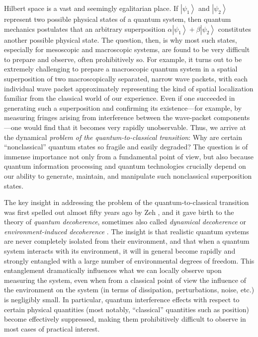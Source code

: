\documentclass[3p,sort&compress,12pt]{elsarticle}
\newcommand{\ket}[1]{\left\vert{#1}\right\rangle}
\begin{document}
Hilbert space is a vast and seemingly egalitarian place. If $\ket{\psi_1}$ and $\ket{\psi_2}$ represent two possible physical states of a quantum system, then quantum mechanics postulates that an arbitrary superposition $\alpha\ket{\psi_1} + \beta \ket{\psi_2}$ constitutes another possible physical state. The question, then, is why most such states, especially for mesoscopic and macroscopic systems, are found to be very difficult to prepare and observe, often prohibitively so. For example, it turns out to be extremely challenging to prepare a macroscopic quantum system in a spatial superposition of two macroscopically separated, narrow wave packets, with each individual wave packet approximately representing the kind of spatial localization familiar from the classical world of our experience. Even if one succeeded in generating such a superposition and confirming its existence---for example, by measuring fringes arising from interference between the wave-packet components---one would find that it becomes very rapidly unobservable. Thus, we arrive at the dynamical \emph{problem of the quantum-to-classical transition}: Why are certain ``nonclassical'' quantum states so fragile and easily degraded? The question is of immense importance not only from a fundamental point of view, but also because quantum information processing and quantum technologies crucially depend on our ability to generate, maintain, and manipulate such nonclassical superposition states. 

The key insight in addressing the problem of the quantum-to-classical transition was first spelled out almost fifty years ago by Zeh \cite{Zeh:1970:yt}, and it gave birth to the theory of \emph{quantum decoherence}, sometimes also called \emph{dynamical decoherence} or \emph{environment-induced decoherence} \cite{Zeh:1970:yt,Zurek:1981:dd,Zurek:1982:tv,Paz:2001:aa,Zurek:2002:ii,Schlosshauer:2003:tv,Bacciagaluppi:2003:yz,Joos:2003:jh,Schlosshauer:2007:un}. The insight is that realistic quantum systems are never completely isolated from their environment, and that when a quantum system interacts with its environment, it will in general become rapidly  and strongly entangled with a large number of environmental degrees of freedom. This entanglement dramatically influences what we can locally observe upon measuring the system, even when from a classical point of view the influence of the environment on the system (in terms of dissipation, perturbations, noise, etc.) is negligibly small. In particular, quantum interference effects with respect to certain physical quantities (most notably, ``classical'' quantities such as position) become effectively suppressed, making them prohibitively difficult to observe in most cases of practical interest.
\end{document}
